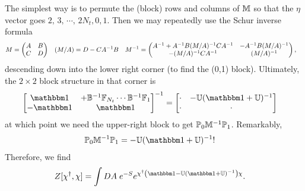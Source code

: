 The simplest way is to permute the (block) rows and columns of $\mathbb{M}$ so that the $\eta$ vector goes $2,\, 3,\, \cdots,\, 2N_t, 0, 1$.
Then we may repeatedly use the Schur inverse formula
\begin{align}
	M
	&=
	\begin{pmatrix} A & B \\ C & D \end{pmatrix}
	&
	(M/A)
	&=
	D-CA^{-1} B
	&
	M^{-1}
	&=
	\begin{pmatrix}
		A^{-1} + A^{-1} B (M/A)^{-1} C A^{-1} & - A^{-1} B (M/A)^{-1} \\
		- (M/A)^{-1} C A^{-1} & (M/A)^{-1}
	\end{pmatrix},
\end{align}
descending down into the lower right corner (to find the (0,1) block).
Ultimately, the $2\times2$ block structure in that corner is
\begin{align}
	\begin{bmatrix}
		\one & + \BB\inverse \FF_{N_t} \cdots \BB\inverse \FF_1
		\\
		-\one & \one
	\end{bmatrix}^{-1}
	&=
	\begin{bmatrix}
		\cdot & - \UU (\one + \UU)\inverse \\
		\cdot & \cdot
	\end{bmatrix}
\end{align}
at which point we need the upper-right block to get $\mathbb{P}_0 \mathbb{M}^{-1} \mathbb{P}_1$.
Remarkably,
\begin{align}
	\PP_0 \MM\inverse \PP_1 &= -\UU (\one+\UU)\inverse!
\end{align}
Therefore, we find
\begin{align}
	Z[\chi\adjoint, \chi]
	&=
	\int DA\; e^{-S }
		e^{ \chi\adjoint \left(\one - \UU (\one+\UU)\inverse\right)\chi }.
\end{align}

